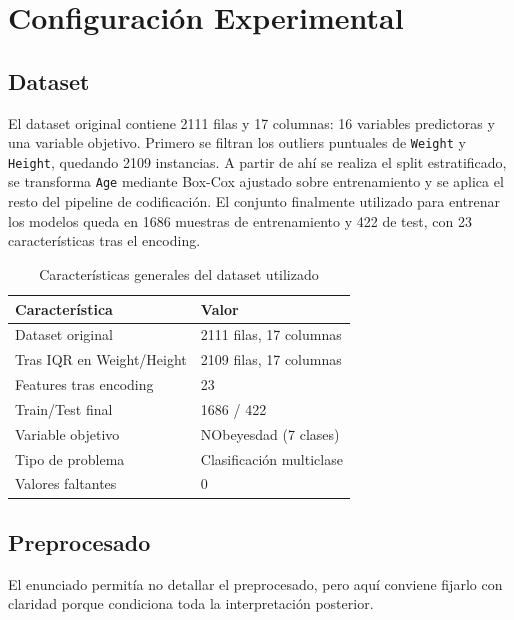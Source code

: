 \documentclass[11pt,a4paper]{article}
\begin{document}
\section{Configuración Experimental}

\subsection{Dataset}

El dataset original contiene 2111 filas y 17 columnas: 16 variables predictoras y una variable objetivo. Primero se filtran los outliers puntuales de \texttt{Weight} y \texttt{Height}, quedando 2109 instancias. A partir de ahí se realiza el split estratificado, se transforma \texttt{Age} mediante Box-Cox ajustado sobre entrenamiento y se aplica el resto del pipeline de codificación. El conjunto finalmente utilizado para entrenar los modelos queda en 1686 muestras de entrenamiento y 422 de test, con 23 características tras el encoding.

\begin{table}[H]
\centering
\caption{Características generales del dataset utilizado}
\label{tab:dataset_info}
\small
\begin{tabular}{@{}ll@{}}
\toprule
\textbf{Característica} & \textbf{Valor} \\ \midrule
Dataset original & 2111 filas, 17 columnas \\
Tras IQR en Weight/Height & 2109 filas, 17 columnas \\
Features tras encoding & 23 \\
Train/Test final & 1686 / 422 \\
Variable objetivo & NObeyesdad (7 clases) \\
Tipo de problema & Clasificación multiclase \\
Valores faltantes & 0 \\ \bottomrule
\end{tabular}
\end{table}

\subsection{Preprocesado}

El enunciado permitía no detallar el preprocesado, pero aquí conviene fijarlo con claridad porque condiciona toda la interpretación posterior.
\end{document}
